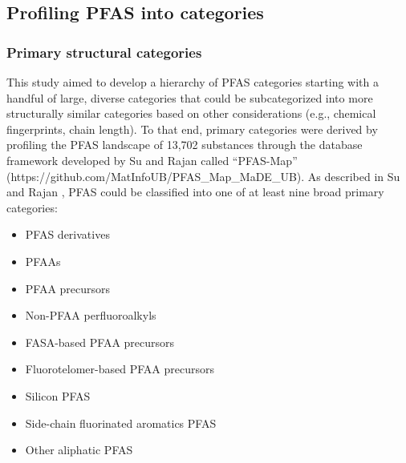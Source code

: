 \documentclass[
  super,
  preprint,
  3p]{elsarticle}
\providecommand{\tightlist}{%
  \setlength{\itemsep}{0pt}\setlength{\parskip}{0pt}}\usepackage{longtable,booktabs,array}
\begin{document}
\hypertarget{profiling-pfas-into-categories}{%
\subsection{Profiling PFAS into
categories}\label{profiling-pfas-into-categories}}

\hypertarget{sec-primary-categories}{%
\subsubsection{Primary structural
categories}\label{sec-primary-categories}}

This study aimed to develop a hierarchy of PFAS categories starting with
a handful of large, diverse categories that could be subcategorized into
more structurally similar categories based on other considerations
(e.g., chemical fingerprints, chain length). To that end, primary
categories were derived by profiling the PFAS landscape of 13,702
substances through the database framework developed by Su and Rajan
\citep{su_database_2021} called ``PFAS-Map''
(https://github.com/MatInfoUB/PFAS\_Map\_MaDE\_UB). As described in Su
and Rajan \citep{su_database_2021}, PFAS could be classified into one of
at least nine broad primary categories:

\begin{itemize}
\tightlist
\item
  PFAS derivatives
\item
  PFAAs
\item
  PFAA precursors
\item
  Non-PFAA perfluoroalkyls
\item
  FASA-based PFAA precursors
\item
  Fluorotelomer-based PFAA precursors
\item
  Silicon PFAS
\item
  Side-chain fluorinated aromatics PFAS
\item
  Other aliphatic PFAS
\end{itemize}
\end{document}
